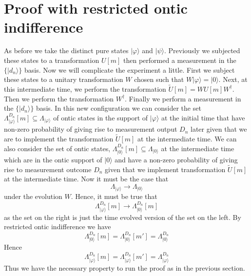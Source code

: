 \documentclass[12pt]{article}
\begin{document}
\section{Proof with restricted ontic indifference} \label{proofwithrestricted}

As before we take the distinct pure states $|\varphi\rangle$ and $|\psi\rangle$.  Previously we subjected these states to a transformation $U[m]$ then performed a measurement in the
$\{|d_n\rangle\}$ basis.  Now we will complicate the experiment a little.  First we subject these states to a unitary transformation $W$ chosen such that $W|\varphi\rangle = |0\rangle$.
Next, at this intermediate time, we perform the transformation $\tilde{U}[m]= WU[m]W^\dagger$.  Then we perform the transformation $W^\dagger$.   Finally we perform a measurement in the
$\{|d_n\rangle\}$ basis.   In this new configuration we can consider the set $\Lambda_{|\varphi\rangle}^{D_n}[m] \subseteq \Lambda_{|\varphi\rangle}$ of ontic states in the support of
$|\varphi\rangle$ at the initial time that have non-zero probability of giving rise to measurement output $D_n$ later given that we are to implement the transformation $\tilde{U}[m]$ at the
intermediate time.    We can also consider the set of ontic states, $\Lambda_{|0\rangle}^{D_n}[m] \subseteq \Lambda_{|0\rangle}$ at the intermediate time which are in the ontic support of
$|0\rangle$ and have a non-zero probability of giving rise to measurement outcome $D_n$  given that we implement transformation $\tilde{U}[m]$ at the intermediate time.  Now it must be the
case that \begin{equation} \Lambda_{|\varphi\rangle} \longrightarrow \Lambda_{|0\rangle} \end{equation} under the evolution $W$.   Hence, it must be true that \begin{equation}
\Lambda_{|\varphi\rangle}^{D_n}[m] \longrightarrow \Lambda_{|0\rangle}^{D_n}[m] \end{equation} as the set on the right is just the time evolved version of the set on the left.  By restricted
ontic indifference we have \begin{equation} \Lambda_{|0\rangle}^{D_n}[m] = \Lambda_{|0\rangle}^{D_n}[m'] = \Lambda_{|0\rangle}^{D_n} \end{equation} Hence \begin{equation}
\Lambda_{|\varphi\rangle}^{D_n}[m] = \Lambda_{|\varphi\rangle}^{D_n}[m'] = \Lambda_{|\varphi\rangle}^{D_n} \end{equation} Thus we have the necessary property to run the proof as in the
previous section.
\end{document}
